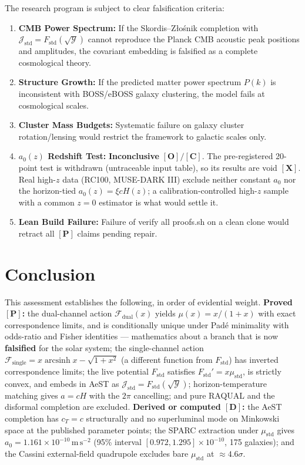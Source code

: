 \documentclass[aps,prd,preprint,superscriptaddress,nofootinbib,amsmath,amssymb,floatfix]{revtex4-2}
\makeatletter
\DeclareRobustCommand{\rntexttt}[1]{%
  \ifmmode
    \nfss@text{\ttfamily\hyphenchar\font=-1 #1}%
  \else
    \hmode@bgroup\ttfamily\hyphenchar\font=-1 #1\egroup
  \fi}
\DeclareRobustCommand{\_}{%
    \ifmmode\nfss@text{\textunderscore}\else\textunderscore\penalty\z@\fi}%
\let\texttt\rntexttt
\makeatother
\begin{document}
The research program is subject to clear falsification criteria:
\begin{enumerate}
    \item \textbf{CMB Power Spectrum:} If the Skordis--Z\l{}o\'snik completion with $\mathcal{J}_{\text{std}} = F_{\text{std}}(\sqrt{\mathcal{Y}})$ cannot reproduce the Planck CMB acoustic peak positions and amplitudes, the covariant embedding is falsified as a complete cosmological theory.
    \item \textbf{Structure Growth:} If the predicted matter power spectrum $P(k)$ is inconsistent with BOSS/eBOSS galaxy clustering, the model fails at cosmological scales.
    \item \textbf{Cluster Mass Budgets:} Systematic failure on galaxy cluster rotation/lensing would restrict the framework to galactic scales only.
    \item \textbf{$a_0(z)$ Redshift Test:} \textbf{Inconclusive} $\mathbf{[O]/[C]}$. The pre-registered 20-point test is withdrawn (untraceable input table), so its results are void $\mathbf{[X]}$. Real high-$z$ data (RC100, MUSE-DARK III) exclude neither constant $a_0$ nor the horizon-tied $a_0(z) = \xi c H(z)$; a calibration-controlled high-$z$ sample with a common $z=0$ estimator is what would settle it.
    \item \textbf{Lean Build Failure:} Failure of \texttt{verify\_all\_proofs.sh} on a clean clone would retract all $\mathbf{[P]}$ claims pending repair.
\end{enumerate}

\section{Conclusion}
\label{sec:conclusion}

This assessment establishes the following, in order of evidential weight. \textbf{Proved $\mathbf{[P]}$:} the dual-channel action $\mathcal{F}_{\text{dual}}(x)$ yields $\mu(x) = x/(1+x)$ with exact correspondence limits, and is conditionally unique under Pad\'e minimality with odds-ratio and Fisher identities --- mathematics about a branch that is now \textbf{falsified} for the solar system; the single-channel action $\mathcal{F}_{\text{single}} = x\operatorname{arcsinh}x - \sqrt{1+x^2}$ (a different function from $F_{\text{std}}$) has inverted correspondence limits; the live potential $F_{\text{std}}$ satisfies $F_{\text{std}}' = x\mu_{\text{std}}$, is strictly convex, and embeds in AeST as $\mathcal{J}_{\text{std}} = F_{\text{std}}(\sqrt{\mathcal{Y}})$; horizon-temperature matching gives $a = cH$ with the $2\pi$ cancelling; and pure RAQUAL and the disformal completion are excluded. \textbf{Derived or computed $\mathbf{[D]}$:} the AeST completion has $c_T = c$ structurally and no superluminal mode on Minkowski space at the published parameter points; the SPARC extraction under $\mu_{\text{std}}$ gives $a_0 = 1.161\times10^{-10}\,\mathrm{m\,s^{-2}}$ (95\% interval $[0.972, 1.295]\times10^{-10}$, 175 galaxies); and the Cassini external-field quadrupole excludes bare $\mu_{\text{std}}$ at $\approx 4.6\sigma$.
\end{document}
